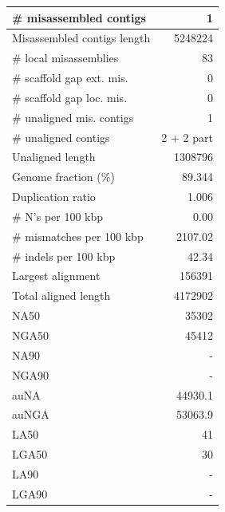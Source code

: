 \documentclass[12pt,a4paper]{article}
\begin{document}
\begin{table}[ht]
\begin{center}
\begin{tabular}{|l*{1}{|r}|}
\# misassembled contigs & 1 \\ \hline
Misassembled contigs length & 5248224 \\ \hline
\# local misassemblies & 83 \\ \hline
\# scaffold gap ext. mis. & 0 \\ \hline
\# scaffold gap loc. mis. & 0 \\ \hline
\# unaligned mis. contigs & 1 \\ \hline
\# unaligned contigs & 2 + 2 part \\ \hline
Unaligned length & 1308796 \\ \hline
Genome fraction (\%) & 89.344 \\ \hline
Duplication ratio & 1.006 \\ \hline
\# N's per 100 kbp & 0.00 \\ \hline
\# mismatches per 100 kbp & 2107.02 \\ \hline
\# indels per 100 kbp & 42.34 \\ \hline
Largest alignment & 156391 \\ \hline
Total aligned length & 4172902 \\ \hline
NA50 & 35302 \\ \hline
NGA50 & 45412 \\ \hline
NA90 & - \\ \hline
NGA90 & - \\ \hline
auNA & 44930.1 \\ \hline
auNGA & 53063.9 \\ \hline
LA50 & 41 \\ \hline
LGA50 & 30 \\ \hline
LA90 & - \\ \hline
LGA90 & - \\ \hline
\end{tabular}
\end{center}
\end{table}
\end{document}

